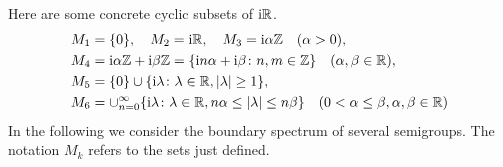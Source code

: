 	Here are some concrete cyclic subsets of $\mathrm{i} \mathbb{R}$.
	\begin{align*}
		M_{1} &= \{0\}, \quad M_{2} = \mathrm{i}\mathbb{R}, \quad M_{3} = \mathrm{i}\alpha\mathbb{Z} \quad (\alpha > 0), \\
		M_{4} &= \mathrm{i}\alpha\mathbb{Z} + \mathrm{i}\beta\mathbb{Z} = \{\mathrm{i} n\alpha +  \mathrm{i}\beta \colon n,m \in \mathbb{Z}\} \quad (\alpha, \beta \in \mathbb{R}), \\
		M_{5} &= \{0\} \cup \{\mathrm{i} \lambda \colon \lambda \in \mathbb{R}, |\lambda| \geq 1\}, \\
		M_{6} &= \cup_{n=0}^{\infty}\{\mathrm{i} \lambda \colon \lambda \in \mathbb{R}, n\alpha \leq |\lambda| \leq n\beta\} \quad (0 < \alpha \leq \beta, \alpha,\beta \in \mathbb{R})
	\end{align*}
	In the following we consider the boundary spectrum of several semigroups. 
    The notation $M_{k}$ refers to the sets just defined.
